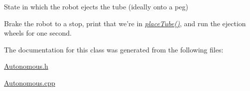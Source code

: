 State in which the robot ejects the tube (ideally onto a peg) 

Brake the robot to a stop, print that we're in {\itshape \hyperlink{class_r_j_f_r_c2011_1_1_autonomous_ac2f9296b723f0f862c40f39a3d10dda2}{placeTube()}\/}, and run the ejection wheels for one second. 

The documentation for this class was generated from the following files:\begin{DoxyCompactItemize}
\item 
\hyperlink{_autonomous_8h}{Autonomous.h}\item 
\hyperlink{_autonomous_8cpp}{Autonomous.cpp}\end{DoxyCompactItemize}
